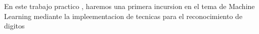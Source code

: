 En este trabajo practico , haremos una primera incursion en el tema de Machine Learning mediante la impleementacion de tecnicas para el reconocimiento de digitos

